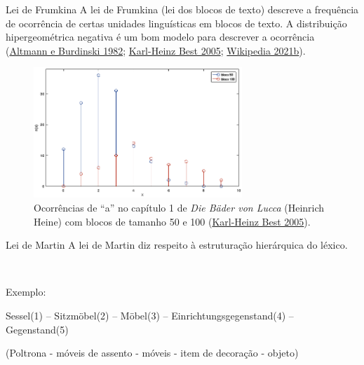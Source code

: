 \documentclass[
  ignorenonframetext,
  aspectratio=169]{beamer}
\begin{document}
\begin{frame}{Lei de Frumkina}
\protect\hypertarget{lei-de-frumkina}{}
A lei de Frumkina (lei dos blocos de texto) descreve a frequência de
ocorrência de certas unidades linguísticas em blocos de texto. A
distribuição hipergeométrica negativa é um bom modelo para descrever a
ocorrência (\protect\hyperlink{ref-altmann1982towards}{Altmann e
Burdinski 1982}; \protect\hyperlink{ref-best2005sprachliche}{Karl-Heinz
Best 2005}; \protect\hyperlink{ref-textblockgesetz2021}{Wikipedia
2021b}).
\end{frame}

\begin{frame}
\begin{figure}
\centering
\includegraphics[width=0.7\textwidth,height=\textheight]{frumkina-a.png}
\caption{Ocorrências de ``a'' no capítulo 1 de \emph{Die Bäder von
Lucca} (Heinrich Heine) com blocos de tamanho 50 e 100
(\protect\hyperlink{ref-best2005sprachliche}{Karl-Heinz Best 2005}).}
\end{figure}
\end{frame}

\begin{frame}{Lei de Martin}
\protect\hypertarget{lei-de-martin}{}
A lei de Martin diz respeito à estruturação hierárquica do léxico.

~

Exemplo:

Sessel(1) -- Sitzmöbel(2) -- Möbel(3) -- Einrichtungsgegenstand(4) --
Gegenstand(5)

(Poltrona - móveis de assento - móveis - item de decoração - objeto)

\end{frame}
\end{document}
